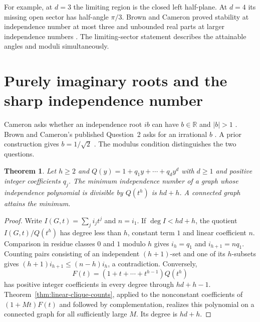\documentclass[11pt,a4paper]{article}
\newtheorem{theorem}{Theorem}[section]
\begin{document}
For example, at $d=3$ the limiting region is the closed left half-plane. At $d=4$ its missing open sector has half-angle $\pi/3$. Brown and Cameron proved stability at independence number at most three and unbounded real parts at larger independence numbers \cite{stability}. The limiting-sector statement describes the attainable angles and moduli simultaneously.

\section{Purely imaginary roots and the sharp independence number}
\label{sec:imaginary}

Cameron asks whether an independence root $ib$ can have $b\in\mathbb R$
and $|b|>1$ \cite{cameronweb}. Brown and Cameron's published Question~2
asks for an irrational $b$ \cite{browncameron}. A prior construction gives
$b=1/\sqrt2$ \cite{tru}. The modulus condition distinguishes the two
questions.

\begin{theorem}\label{thm:spaced-factor}
Let $h\ge2$ and $Q(y)=1+q_1y+\cdots+q_dy^d$ with $d\ge1$
and positive integer coefficients $q_j$. The minimum independence
number of a graph whose independence polynomial is divisible by
$Q(t^h)$ is $hd+h$. A connected graph attains the minimum.
\end{theorem}
\begin{proof}
Write $I(G,t)=\sum_j i_jt^j$ and $n=i_1$. If $\deg I<hd+h$,
the quotient $I(G,t)/Q(t^h)$ has degree less than $h$, constant
term $1$ and linear coefficient $n$. Comparison in residue classes
$0$ and $1$ modulo $h$ gives $i_h=q_1$ and $i_{h+1}=nq_1$.
Counting pairs consisting of an independent $(h+1)$-set and one of
its $h$-subsets gives $(h+1)i_{h+1}\le(n-h)i_h$, a contradiction.
Conversely,
\[
 F(t)=(1+t+\cdots+t^{h-1})Q(t^h)
\]
has positive integer coefficients in every degree through $hd+h-1$.
Theorem~\ref{thm:linear-clique-counts}, applied to the nonconstant
coefficients of $(1+Mt)F(t)$ and followed by complementation,
realizes this polynomial on a connected graph for all sufficiently
large $M$. Its degree is $hd+h$.
\end{proof}
\end{document}
